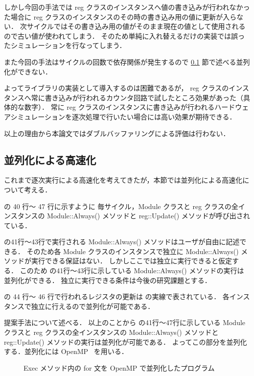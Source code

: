しかし今回の手法では reg クラスのインスタンスへ値の書き込みが行われなかった場合に
reg クラスのインスタンスのその時の書き込み用の値に更新が入らない．
次サイクルではその書き込み用の値がそのまま現在の値として使用されるので古い値が使われてしまう．
そのため単純に入れ替えるだけの実装では誤ったシミュレーションを行なってしまう．

また今回の手法はサイクルの回数で依存関係が発生するので \ref{ss:parallel} 節で述べる並列化ができない．

よってライブラリの実装として導入するのは困難であるが，
reg クラスのインスタンスへ常に書き込みが行われるカウンタ回路で試したところ効果があった（具体的な数字）．
常に reg クラスのインスタンスに書き込みが行われるハードウェアシミュレーションを逐次処理で行いたい場合には高い効果が期待できる．

以上の理由から本論文ではダブルバッファリングによる評価は行わない．

\fi

\subsection{並列化による高速化} \label{ss:parallel}

これまで逐次実行による高速化を考えてきたが，本節では並列化による高速化について考える．

 の 40 行〜 47 行に示すように
毎サイクル，Module クラスと reg クラスの全インスタンスの Module::Always() メソッドと reg::Update() メソッドが呼び出されている．

 の41行〜43行で実行される Module::Always() メソッドはユーザが自由に記述できる．
そのため各 Module クラスのインスタンスで独立に Module::Always() メソッドが実行できる保証はない．
しかしここでは独立に実行できると仮定する．
このため の41行〜43行に示している Module::Always() メソッドの実行は並列化ができる．
独立に実行できる条件は今後の研究課題とする．

 の 44 行〜 46 行で行われるレジスタの更新は の実線で表されている．
各インスタンスで独立に行えるので並列化が可能である．

提案手法について述べる．
以上のことから の41行〜47行に示している
Module クラスと reg クラスの全インスタンスの Module::Always() メソッドと reg::Update() メソッドの実行は並列化が可能である．
よってこの部分を並列化する．並列化には OpenMP~\cite{openmp} を用いる．

\begin{figure}[t]
 
 \caption{Exec メソッド内の for 文を OpenMP で並列化したプログラム}
 \label{src:exec_openmp}
\end{figure}

